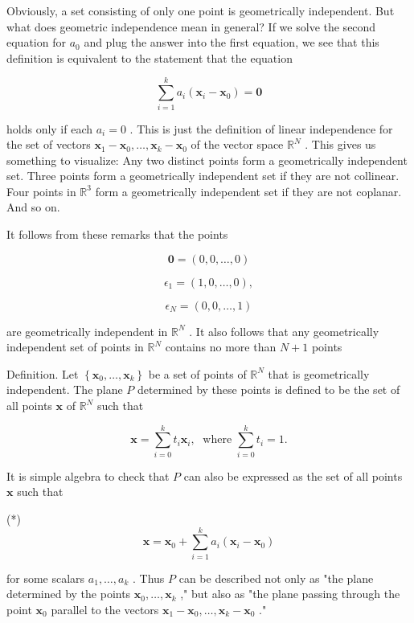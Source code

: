\documentclass[10pt]{article}
\begin{document}
Obviously, a set consisting of only one point is geometrically independent. But what does geometric independence mean in general? If we solve the second equation for \({a}_{0}\) and plug the answer into the first equation, we see that this definition is equivalent to the statement that the equation

\[
\mathop{\sum }\limits_{{i = 1}}^{k}{a}_{i}\left( {{\mathbf{x}}_{i} - {\mathbf{x}}_{0}}\right)  = \mathbf{0}
\]

holds only if each \({a}_{i} = 0\) . This is just the definition of linear independence for the set of vectors \({\mathbf{x}}_{1} - {\mathbf{x}}_{0},\ldots ,{\mathbf{x}}_{k} - {\mathbf{x}}_{0}\) of the vector space \({\mathbb{R}}^{N}\) . This gives us something to visualize: Any two distinct points form a geometrically independent set. Three points form a geometrically independent set if they are not collinear. Four points in \({\mathbb{R}}^{3}\) form a geometrically independent set if they are not coplanar. And so on.

It follows from these remarks that the points

\[
\mathbf{0} = \left( {0,0,\ldots ,0}\right)
\]

\[
{\epsilon }_{1} = \left( {1,0,\ldots ,0}\right) ,
\]

\[
{\epsilon }_{N} = \left( {0,0,\ldots ,1}\right)
\]

are geometrically independent in \({\mathbb{R}}^{N}\) . It also follows that any geometrically independent set of points in \({\mathbb{R}}^{N}\) contains no more than \(N + 1\) points

Definition. Let \(\left\{  {{\mathbf{x}}_{0},\ldots ,{\mathbf{x}}_{k}}\right\}\) be a set of points of \({\mathbb{R}}^{N}\) that is geometrically independent. The plane \(P\) determined by these points is defined to be the set of all points \(\mathbf{x}\) of \({\mathbb{R}}^{N}\) such that

\[
\mathbf{x} = \mathop{\sum }\limits_{{i = 0}}^{k}{t}_{i}{\mathbf{x}}_{i},\;\text{ where }\mathop{\sum }\limits_{{i = 0}}^{k}{t}_{i} = 1.
\]

It is simple algebra to check that \(P\) can also be expressed as the set of all points \(\mathbf{x}\) such that

(*)
\[
\mathbf{x} = {\mathbf{x}}_{0} + \mathop{\sum }\limits_{{i = 1}}^{k}{a}_{i}\left( {{\mathbf{x}}_{i} - {\mathbf{x}}_{0}}\right)
\]

for some scalars \({a}_{1},\ldots ,{a}_{k}\) . Thus \(P\) can be described not only as "the plane determined by the points \({\mathbf{x}}_{0},\ldots ,{\mathbf{x}}_{k}\) ," but also as "the plane passing through the point \({\mathbf{x}}_{0}\) parallel to the vectors \({\mathbf{x}}_{1} - {\mathbf{x}}_{0},\ldots ,{\mathbf{x}}_{k} - {\mathbf{x}}_{0}\) ."
\end{document}
